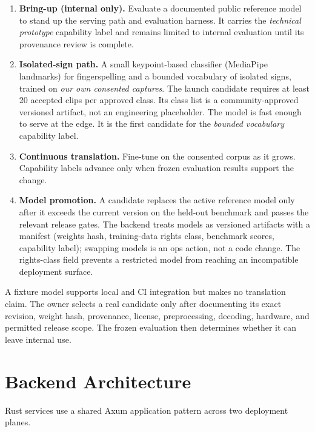 \documentclass[11pt]{article}
\begin{document}
\begin{enumerate}[nosep]
  \item \textbf{Bring-up (internal only).} Evaluate a documented public reference
        model to stand up the serving path and evaluation harness. It carries the
        \emph{technical prototype} capability label and remains limited to internal
        evaluation until its provenance review is complete.
  \item \textbf{Isolated-sign path.} A small
        keypoint-based classifier (MediaPipe landmarks) for fingerspelling and a
        bounded vocabulary of isolated signs, trained on \emph{our own consented
        captures}. The launch candidate requires at least 20 accepted clips per
        approved class. Its class list is a community-approved versioned artifact,
        not an engineering placeholder. The model is fast
        enough to serve at the edge. It is the first candidate for the
        \emph{bounded vocabulary} capability label.
  \item \textbf{Continuous translation.} Fine-tune on the consented corpus as it
        grows. Capability labels advance only when frozen evaluation results support
        the change.
  \item \textbf{Model promotion.} A candidate replaces the active reference model
        only after it exceeds the current version on the held-out benchmark and
        passes the relevant release gates.
        The backend treats models as versioned artifacts with a manifest (weights
        hash, training-data rights class, benchmark scores, capability label);
        swapping models is an ops action, not a code change. The rights-class field
        prevents a restricted model from reaching an incompatible deployment
        surface.
\end{enumerate}

A fixture model supports local and CI integration but makes no translation claim.
The owner selects a real candidate only after documenting its exact revision, weight
hash, provenance, license, preprocessing, decoding, hardware, and permitted release
scope. The frozen evaluation then determines whether it can leave internal use.

\section{Backend Architecture}
\label{sec:backend}

Rust services use a shared Axum application pattern across two deployment planes.
\end{document}
